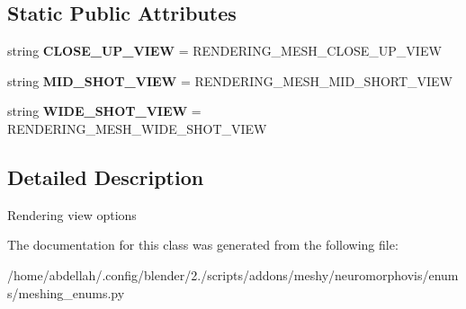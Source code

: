 \subsection*{Static Public Attributes}
\begin{DoxyCompactItemize}
\item 
string {\bfseries C\+L\+O\+S\+E\+\_\+\+U\+P\+\_\+\+V\+I\+EW} = \textquotesingle{}R\+E\+N\+D\+E\+R\+I\+N\+G\+\_\+\+M\+E\+S\+H\+\_\+\+C\+L\+O\+S\+E\+\_\+\+U\+P\+\_\+\+V\+I\+EW\textquotesingle{}\hypertarget{classmeshy_1_1neuromorphovis_1_1enums_1_1meshing__enums_1_1Meshing_1_1Rendering_1_1View_ab56afc3dcdcfdfcd115427b29f1cd192}{}\label{classmeshy_1_1neuromorphovis_1_1enums_1_1meshing__enums_1_1Meshing_1_1Rendering_1_1View_ab56afc3dcdcfdfcd115427b29f1cd192}

\item 
string {\bfseries M\+I\+D\+\_\+\+S\+H\+O\+T\+\_\+\+V\+I\+EW} = \textquotesingle{}R\+E\+N\+D\+E\+R\+I\+N\+G\+\_\+\+M\+E\+S\+H\+\_\+\+M\+I\+D\+\_\+\+S\+H\+O\+R\+T\+\_\+\+V\+I\+EW\textquotesingle{}\hypertarget{classmeshy_1_1neuromorphovis_1_1enums_1_1meshing__enums_1_1Meshing_1_1Rendering_1_1View_acf2147bf0c611b90014c56013652644d}{}\label{classmeshy_1_1neuromorphovis_1_1enums_1_1meshing__enums_1_1Meshing_1_1Rendering_1_1View_acf2147bf0c611b90014c56013652644d}

\item 
string {\bfseries W\+I\+D\+E\+\_\+\+S\+H\+O\+T\+\_\+\+V\+I\+EW} = \textquotesingle{}R\+E\+N\+D\+E\+R\+I\+N\+G\+\_\+\+M\+E\+S\+H\+\_\+\+W\+I\+D\+E\+\_\+\+S\+H\+O\+T\+\_\+\+V\+I\+EW\textquotesingle{}\hypertarget{classmeshy_1_1neuromorphovis_1_1enums_1_1meshing__enums_1_1Meshing_1_1Rendering_1_1View_a74bdd8e3236b6e5a3eb2129838b6acaf}{}\label{classmeshy_1_1neuromorphovis_1_1enums_1_1meshing__enums_1_1Meshing_1_1Rendering_1_1View_a74bdd8e3236b6e5a3eb2129838b6acaf}

\end{DoxyCompactItemize}


\subsection{Detailed Description}


\begin{DoxyVerb}Rendering view options
\end{DoxyVerb}
 

The documentation for this class was generated from the following file\+:\begin{DoxyCompactItemize}
\item 
/home/abdellah/.\+config/blender/2./scripts/addons/meshy/neuromorphovis/enums/meshing\+\_\+enums.\+py\end{DoxyCompactItemize}
